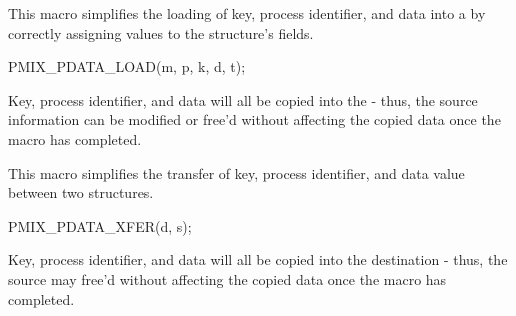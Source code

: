
This macro simplifies the loading of key, process identifier, and data into a  by correctly assigning values to the structure's fields.

\cspecificstart
\begin{codepar}
PMIX_PDATA_LOAD(m, p, k, d, t);
\end{codepar}
\cspecificend

\begin{arglist}
\end{arglist}

\adviceuserstart
Key, process identifier, and data will all be copied into the  - thus, the source information can be modified or free'd without affecting the copied data once the macro has completed.
\adviceuserend


This macro simplifies the transfer of key, process identifier, and data value between two structures.

\cspecificstart
\begin{codepar}
PMIX_PDATA_XFER(d, s);
\end{codepar}
\cspecificend

\begin{arglist}
\end{arglist}

\adviceuserstart
Key, process identifier, and data will all be copied into the destination  - thus, the source  may free'd without affecting the copied data once the macro has completed.
\adviceuserend


